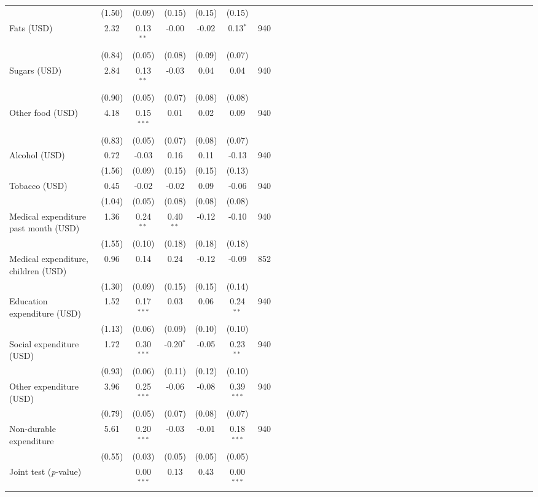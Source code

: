 {\begin{tabular}{l*{6}{SSSSSc}}
          &   (1.50)&   (0.09)&   (0.15)&   (0.15)&   (0.15)&         \\
\hspace{0.2cm}Fats (USD)&     2.32&0.13$^{**}$&    -0.00&    -0.02&0.13$^{*}$&      940\\
          &   (0.84)&   (0.05)&   (0.08)&   (0.09)&   (0.07)&         \\
\hspace{0.2cm}Sugars (USD)&     2.84&0.13$^{**}$&    -0.03&     0.04&     0.04&      940\\
          &   (0.90)&   (0.05)&   (0.07)&   (0.08)&   (0.08)&         \\
\hspace{0.2cm}Other food (USD)&     4.18&0.15$^{***}$&     0.01&     0.02&     0.09&      940\\
          &   (0.83)&   (0.05)&   (0.07)&   (0.08)&   (0.07)&         \\
Alcohol (USD)&     0.72&    -0.03&     0.16&     0.11&    -0.13&      940\\
          &   (1.56)&   (0.09)&   (0.15)&   (0.15)&   (0.13)&         \\
Tobacco (USD)&     0.45&    -0.02&    -0.02&     0.09&    -0.06&      940\\
          &   (1.04)&   (0.05)&   (0.08)&   (0.08)&   (0.08)&         \\
Medical expenditure past month (USD)&     1.36&0.24$^{**}$&0.40$^{**}$&    -0.12&    -0.10&      940\\
          &   (1.55)&   (0.10)&   (0.18)&   (0.18)&   (0.18)&         \\
\hspace{0.2cm}Medical expenditure, children (USD)&     0.96&     0.14&     0.24&    -0.12&    -0.09&      852\\
          &   (1.30)&   (0.09)&   (0.15)&   (0.15)&   (0.14)&         \\
Education expenditure (USD)&     1.52&0.17$^{***}$&     0.03&     0.06&0.24$^{**}$&      940\\
          &   (1.13)&   (0.06)&   (0.09)&   (0.10)&   (0.10)&         \\
Social expenditure (USD)&     1.72&0.30$^{***}$&-0.20$^{*}$&    -0.05&0.23$^{**}$&      940\\
          &   (0.93)&   (0.06)&   (0.11)&   (0.12)&   (0.10)&         \\
Other expenditure (USD)&     3.96&0.25$^{***}$&    -0.06&    -0.08&0.39$^{***}$&      940\\
          &   (0.79)&   (0.05)&   (0.07)&   (0.08)&   (0.07)&         \\
Non-durable expenditure&     5.61&0.20$^{***}$&    -0.03&    -0.01&0.18$^{***}$&      940\\
          &   (0.55)&   (0.03)&   (0.05)&   (0.05)&   (0.05)&         \\
\midrule Joint test (\emph{p}-value)&         &0.00$^{***}$&     0.13&     0.43&0.00$^{***}$&         \\
\bottomrule
\end{tabular}
}
